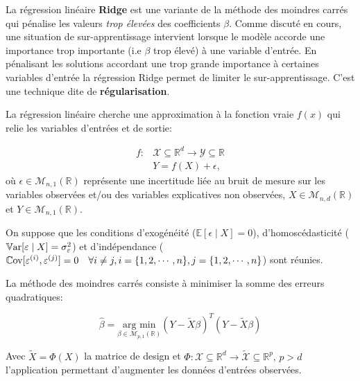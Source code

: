 \documentclass[solutions]{../exercices}
\begin{document}

La régression linéaire \textbf{Ridge} est une variante de la méthode des moindres carrés qui pénalise les valeurs \textit{trop élevées} des coefficients $\beta$. Comme discuté en cours, une situation de sur-apprentissage intervient lorsque le modèle accorde une importance trop importante (i.e $\beta$ trop élevé) à une variable d'entrée. En pénalisant les solutions accordant une trop grande importance à certaines variables d'entrée la régression Ridge permet de limiter le sur-apprentissage. C'est une technique dite de \textbf{régularisation}.

La régression linéaire cherche une approximation à la fonction vraie $f(x)$ qui relie les variables d'entrées et de sortie:

\begin{equation}
	\begin{aligned}
		f: &\mathcal{X} \subseteq \mathbb{R}^d \to \mathcal{Y} \subseteq \mathbb{R} \\
		&Y = f(X) + \epsilon,
	\end{aligned}
	\label{eqn:problematique}
\end{equation}
où $\epsilon \in \mathcal{M}_{n,1}(\mathbb{R})$ représente une incertitude liée au bruit de mesure sur les variables observées et/ou des variables explicatives non observées, $X \in \mathcal{M}_{n,d}(\mathbb{R})$ et $Y \in \mathcal{M}_{n,1}(\mathbb{R})$.

On suppose que les conditions d'exogénéité ($\mathbb{E}[\epsilon \mid X] = 0$), d'homoscédasticité ($\mathbb{V}\mathrm{ar}{[\varepsilon \mid X]} = \sigma_{\varepsilon}^2$) et d'indépendance ($\mathbb{C}\mathrm{ov}{[\varepsilon^{(i)}, \varepsilon^{(j)}]} = 0 \quad \forall i \ne j, i = \{1, 2, \cdots, n\}, j = \{1, 2, \cdots, n\}$) sont réunies.

La méthode des moindres carrés consiste à minimiser la somme des erreurs quadratiques:

\begin{equation}
	\hat{\beta} = \underset{\beta \in \mathcal{M}_{p,1}(\mathbb{R})}{\text{arg min}} \left(Y - \tilde{X}\beta\right)^T \left(Y - \tilde{X}\beta\right)
	\label{eqn:moindres-carres}
\end{equation}

Avec $\tilde{X} = \Phi(X)$ la matrice de design et $\Phi: \mathcal{X} \subseteq \mathbb{R}^d \to \tilde{\mathcal{X}} \subseteq \mathbb{R}^p, \, p > d$ l'application permettant d'augmenter les données d'entrées observées.
\end{document}
